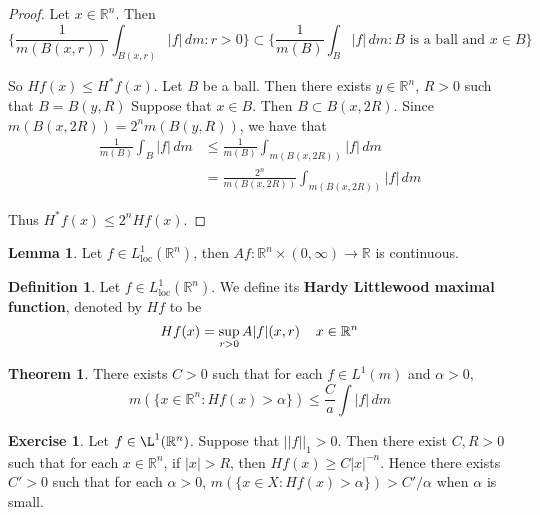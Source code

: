 \documentclass[12pt]{amsart}
\theoremstyle{definition}
\newtheorem{defn}[definition]{Definition}
\newtheorem{thm}[definition]{Theorem}
\newtheorem{lem}[definition]{Lemma}
\newtheorem{ex}[definition]{Exercise}
\newcommand{\al}{\alpha}
\newcommand{\R}{\mathbb{R}}
\newcommand{\dm}{\, d m}
\newcommand{\Ll}{L^1_{\text{loc}}(\R^n)}
\newcommand{\lex}[1]{\label{ex:#1}}
\newcommand{\ld}[1]{\label{defn:#1}}
\begin{document}
	\begin{proof}
		Let $x \in \R^n$. Then $$\bigg \{ \frac{1}{m(B(x,r))}\int_{B(x,r)}|f|\dm: r >0\bigg \} \subset \bigg\{ \frac{1}{m(B)}\int_{B}|f|\dm: B \text{ is a ball and } x \in B \bigg\} $$
		
		So $Hf(x) \leq H^*f(x)$. Let $B$ be a ball. Then there exists $y \in \R^n$, $R>0$ such that $B = B(y,R)$ Suppose that $x \in B$. Then $B \subset B(x,2R)$. Since $m(B(x,2R)) = 2^n m(B(y,R))$, we have that 
		\begin{align*}
			\frac{1}{m(B)}\int_{B}|f|\dm
			& \leq \frac{1}{m(B)} \int_{m(B(x,2R))}|f|\dm\\
			&= \frac{2^n}{m(B(x,2R))} \int_{m(B(x,2R))}|f|\dm
		\end{align*}
		
		Thus $H^*f(x) \leq 2^n Hf(x)$.
	\end{proof}
	
	\begin{lem}
		Let $f \in \Ll$, then $Af:\R^n \times (0, \infty)\rightarrow \R$ is continuous.
	\end{lem}
	
	\begin{defn} \ld{00000} 
		Let $f \in \Ll$. We define its \textbf{Hardy Littlewood maximal function}, denoted by $Hf$ to be $$Hf(x) = \sup_{r>0} A|f|(x,r) \hspace{4mm} x \in \R^n$$
	\end{defn}
	
	\begin{thm}
		There exists $C >0$ such that for each $f \in L^1(m)$ and $\al > 0$, $$m(\{x \in \R^n: Hf(x) > \al\}) \leq \frac{C}{a} \int |f|\dm$$
	\end{thm}
	
	\begin{ex} \lex{00000} 
		Let $f \in \L^1(\R^n)$. Suppose that $||f||_1>0$. Then there exist $C,R>0$ such that for each $x \in \R^n$, if $|x| > R$, then $Hf(x) \geq C|x|^{-n}$. Hence there exists $C' > 0$ such that for each $\al >0$, $m(\{x \in X: Hf(x)>\alpha\}) > C'/\al$ when $\al$ is small. 
	\end{ex}
	
\end{document}

